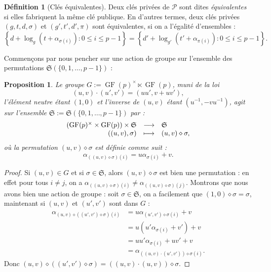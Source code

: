 \documentclass[a4paper, titlepage]{article}
\newtheorem{prop}[theo]{Proposition}
\theoremstyle{definition}
\newtheorem{defi}[theo]{Définition}
\theoremstyle{remark}
\def\gf{\operatorname{GF}}
\begin{document}
\begin{defi}[Clés équivalentes]\label{defiCleEquivalente}
Deux clés privées de $\mathcal{P}$ sont dites \textit{équivalentes} si elles fabriquent la même clé publique. En d'autres termes, deux clés privées $(g,t,d,\sigma)$ et $(g',t',d',\pi)$ sont équivalentes, si on a l'égalité d'ensembles :
$$\left\{d + \log_g(t + \alpha_{\sigma(i)}) : 0\leqslant i \leqslant p-1\right\} = \left\{d' + \log_{g'}(t' + \alpha_{\pi(i)}) : 0\leqslant i \leqslant p-1\right\}.$$
\end{defi}

Commençons par nous pencher sur une action de groupe sur l'ensemble des permutations $\mathfrak{S}(\{0,1,\dots, p-1\})$ :
\begin{prop}
Le groupe $G := \gf(p)^\times\ltimes\gf(p)$, muni de la loi $$(u,v) \cdot (u', v') = (uu', v+uv'),$$ l'élément neutre étant $(1,0)$ et l'inverse de $(u,v)$ étant $(u^{-1}, -vu^{-1})$, agit sur l'ensemble $\mathfrak{S} := \mathfrak{S}(\{0,1,\dots, p-1\})$ par :
$$\begin{array}{r c l}
\left(\gf(p)^\times\times\gf(p)\right) \times \mathfrak{S}& \longrightarrow& \mathfrak{S} \\
((u, v), \sigma) & \longmapsto& (u, v)\diamond\sigma,
\end{array}$$ 
où la permutation $(u, v)\diamond\sigma$ est définie comme suit :
$$\alpha_{((u, v)\diamond\sigma)(i)} = u\alpha_{\sigma(i)} +v.$$ 
\end{prop}

\begin{proof}
Si $(u, v) \in G$ et si $\sigma \in \mathfrak{S}$, alors $(u, v)\diamond\sigma$ est bien une permutation : en effet pour tous $i \neq j$, on a $\alpha_{((u, v)\diamond\sigma)(i)} \neq \alpha_{((u, v)\diamond\sigma)(j)}$.
Montrons que nous avons bien une action de groupe : soit $\sigma \in \mathfrak{S}$, on a facilement que $(1, 0)\diamond\sigma = \sigma$, maintenant si $(u, v)$ et $(u', v')$ sont dans $G$ :
\begin{align*}
\alpha_{(u, v)\diamond((u', v')\diamond\sigma)(i)} &= u\alpha_{(u', v')\diamond\sigma(i)} +v\\
&= u\left(u'\alpha_{\sigma(i)} +v'\right) +v\\
&= uu'\alpha_{\sigma(i)} +uv'+v\\
&= \alpha_{((u, v)\cdot(u', v'))\diamond\sigma(i)}.
\end{align*}
Donc $(u, v)\diamond((u', v')\diamond\sigma) = ((u, v)\cdot(u, v))\diamond\sigma$.
\end{proof}
\end{document}
